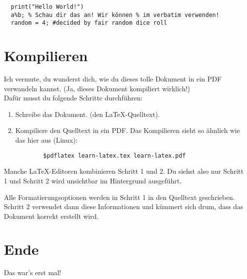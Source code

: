 \documentclass[12pt]{article}
\begin{document}
\begin{verbatim}
  print("Hello World!")
  a%b; % Schau dir das an! Wir können % im verbatim verwenden!
  random = 4; #decided by fair random dice roll
\end{verbatim}

\section{Kompilieren}

Ich vermute, du wunderst dich, wie du dieses tolle Dokument in ein PDF
verwandeln kannst. (Ja, dieses Dokument kompiliert wirklich!) \\

Dafür musst du folgende Schritte durchführen:
  \begin{enumerate}
    \item Schreibe das Dokument. (den \LaTeX -Quelltext).
    \item Kompiliere den Quelltext in ein PDF.
     Das Kompilieren sieht so ähnlich wie das hier aus (Linux): \\
     \begin{verbatim}
        $pdflatex learn-latex.tex learn-latex.pdf
     \end{verbatim}
  \end{enumerate}

Manche \LaTeX-Editoren kombinieren Schritt 1 und 2. Du siehst also nur Schritt 1 und Schritt
2 wird unsichtbar im Hintergrund ausgeführt.

Alle Formatierungsoptionen werden in Schritt 1 in den Quelltext geschrieben. Schritt 2 verwendet
dann diese Informationen und kümmert sich drum, dass das Dokument korrekt erstellt wird.

\section{Ende}

Das war's erst mal!

\end{document}

